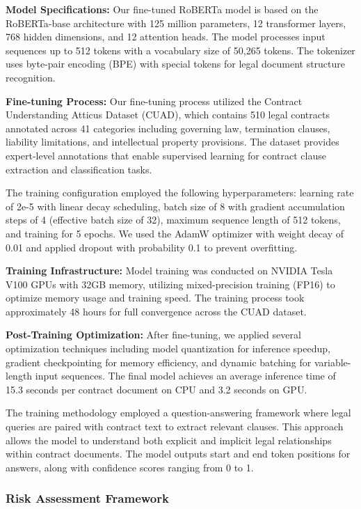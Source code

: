 \textbf{Model Specifications:} Our fine-tuned RoBERTa model is based on the RoBERTa-base architecture with 125 million parameters, 12 transformer layers, 768 hidden dimensions, and 12 attention heads. The model processes input sequences up to 512 tokens with a vocabulary size of 50,265 tokens. The tokenizer uses byte-pair encoding (BPE) with special tokens for legal document structure recognition.

\textbf{Fine-tuning Process:} Our fine-tuning process utilized the Contract Understanding Atticus Dataset (CUAD), which contains 510 legal contracts annotated across 41 categories including governing law, termination clauses, liability limitations, and intellectual property provisions. The dataset provides expert-level annotations that enable supervised learning for contract clause extraction and classification tasks.

The training configuration employed the following hyperparameters: learning rate of 2e-5 with linear decay scheduling, batch size of 8 with gradient accumulation steps of 4 (effective batch size of 32), maximum sequence length of 512 tokens, and training for 5 epochs. We used the AdamW optimizer with weight decay of 0.01 and applied dropout with probability 0.1 to prevent overfitting.

\textbf{Training Infrastructure:} Model training was conducted on NVIDIA Tesla V100 GPUs with 32GB memory, utilizing mixed-precision training (FP16) to optimize memory usage and training speed. The training process took approximately 48 hours for full convergence across the CUAD dataset.

\textbf{Post-Training Optimization:} After fine-tuning, we applied several optimization techniques including model quantization for inference speedup, gradient checkpointing for memory efficiency, and dynamic batching for variable-length input sequences. The final model achieves an average inference time of 15.3 seconds per contract document on CPU and 3.2 seconds on GPU.

The training methodology employed a question-answering framework where legal queries are paired with contract text to extract relevant clauses. This approach allows the model to understand both explicit and implicit legal relationships within contract documents. The model outputs start and end token positions for answers, along with confidence scores ranging from 0 to 1.

\subsubsection{Risk Assessment Framework}

